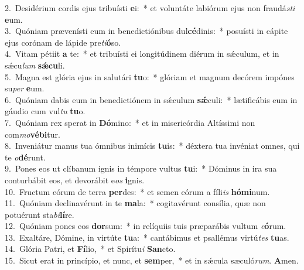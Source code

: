 {2.~}Desidérium cordis ejus tribuísti \textbf{e}i:~* et voluntáte labiórum ejus non fraudá\textit{sti} \textbf{e}um.\\
{3.~}Quóniam prævenísti eum in benedictiónibus dul\textbf{cé}dinis:~* posuísti in cápite ejus corónam de lápide pre\textit{ti}\textbf{ó}so.\\
{4.~}Vitam pétiit \textbf{a} te:~* et tribuísti ei longitúdinem diérum in sǽculum, et in sǽcu\textit{lum} \textbf{sǽ}\textbf{cu}li.\\
{5.~}Magna est glória ejus in salutári \textbf{tu}o:~* glóriam et magnum decórem impónes su\textit{per} \textbf{e}um.\\
{6.~}Quóniam dabis eum in benedictiónem in sǽculum \textbf{sǽ}culi:~* lætificábis eum in gáudio cum vul\textit{tu} \textbf{tu}o.\\
{7.~}Quóniam rex sperat in \textbf{Dó}mino:~* et in misericórdia Altíssimi non com\textit{mo}\textbf{vé}\textbf{bi}tur.\\
{8.~}Inveniátur manus tua ómnibus inimícis \textbf{tu}is:~* déxtera tua invéniat omnes, qui te \textit{o}\textbf{dé}runt.\\
{9.~}Pones eos ut clíbanum ignis in témpore vultus \textbf{tu}i:~* Dóminus in ira sua conturbábit eos, et devorábit e\textit{os} \textbf{i}gnis.\\
{10.~}Fructum eórum de terra \textbf{per}des:~* et semen eórum a fíli\textit{is} \textbf{hó}\textbf{mi}num.\\
{11.~}Quóniam declinavérunt in te \textbf{ma}la:~* cogitavérunt consília, quæ non potuérunt sta\textit{bi}\textbf{lí}re.\\
{12.~}Quóniam pones eos \textbf{dor}sum:~* in relíquiis tuis præparábis vultum \textit{e}\textbf{ó}rum.\\
{13.~}Exaltáre, Dómine, in virtúte \textbf{tu}a:~* cantábimus et psallémus virtú\textit{tes} \textbf{tu}as.\\
{14.~}Glória Patri, et \textbf{Fí}lio,~* et Spirítu\textit{i} \textbf{San}cto.\\
{15.~}Sicut erat in princípio, et nunc, et \textbf{sem}per,~* et in sǽcula sæculó\textit{rum}. \textbf{A}men.\\
